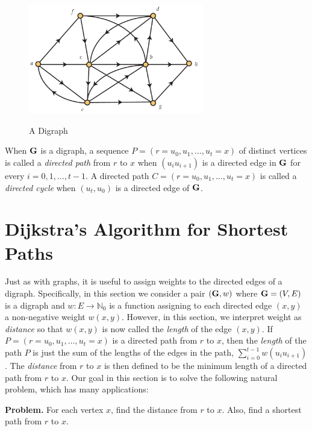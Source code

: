 \begin{figure}[t]
\begin{center}
\includegraphics[width=3in]{graphalgorithms-figs/digraph}\\
\caption{A Digraph}
\label{fig:graphalgorithms:digraph}
\end{center}
\end{figure}

When $\mathbf{G}$ is a digraph, a sequence $P=(r=u_0,u_1,\dots,u_t=x)$ of
distinct vertices is called a \textit{directed path} from $r$ to $x$
when $(u_iu_{i+1})$ is a directed edge in $\mathbf{G}$ for every
$i=0,1,\dots,t-1$.  A directed path $C=(r=u_0,u_1,\dots,u_t=x)$ is
called a \textit{directed cycle} when $(u_t,u_0)$ is a directed edge
of $\mathbf{G}$.

\section{Dijkstra's Algorithm for Shortest Paths}\label{s:graphalgorithms:shortest-paths}

Just as with graphs, it is useful to assign weights to the directed
edges of a digraph. Specifically, in this section we consider a pair
$(\mathbf{G},w)$ where $\mathbf{G}=(V,E)$ is a digraph and $w:E\rightarrow\mathbb{N}_0$
is a function assigning to each directed edge $(x,y)$ a non-negative
weight $w(x,y)$.  However, in this section, we interpret weight as
\textit{distance} so that $w(x,y)$ is now called the \textit{length}
of the edge $(x,y)$.  If $P=(r=u_0,u_1,\dots,u_t=x)$ is a directed
path from $r$ to $x$, then the \textit{length} of the path $P$ is just
the sum of the lengths of the edges in the path, $\sum_{i=0}^{t-1}
w(u_iu_{i+1})$.  The \textit{distance} from $r$ to $x$ is then defined
to be the minimum length of a directed path from $r$ to $x$. Our goal
in this section is to solve the following natural problem, which has
many applications:

\medskip
\noindent\textbf{Problem.}\quad
For each vertex $x$, find the distance from $r$ to $x$.  Also, find a
shortest path from $r$ to $x$.


